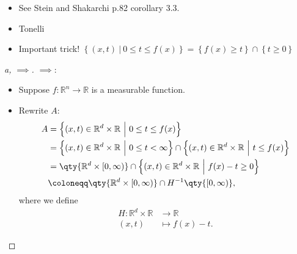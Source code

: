 \begin{concept}

\envlist

\begin{itemize}
\tightlist
\item
  See Stein and Shakarchi p.82 corollary 3.3.
\item
  Tonelli
\item
  Important trick!
  \(\left\{{(x, t) {~\mathrel{\Big|}~}0\leq t \leq f(x)}\right\} = \left\{{ f(x) \geq t}\right\} \cap\left\{{ t\geq 0 }\right\}\)
\end{itemize}

\end{concept}

\begin{solution}

\envlist

\begin{proof}[a, $\implies$]

\(\implies\):

\begin{itemize}
\tightlist
\item
  Suppose \(f:{\mathbb{R}}^n\to {\mathbb{R}}\) is a measurable function.
\item
  Rewrite \(A\):
  \begin{align*}
  A 
  &= \left\{{ (x, t) \in {\mathbb{R}}^d \times{\mathbb{R}}{~\mathrel{\Big|}~}0\leq t \leq f(x) }\right\} \\
  &= \left\{{ (x, t) \in {\mathbb{R}}^d \times{\mathbb{R}}{~\mathrel{\Big|}~}0 \leq t < \infty }\right\} 
  \cap\left\{{ (x, t) \in {\mathbb{R}}^d\times{\mathbb{R}}{~\mathrel{\Big|}~}t\leq f(x) }\right\} \\
  &= \qty{ {\mathbb{R}}^d \times[0, \infty) } 
  \cap\left\{{ (x, t) \in {\mathbb{R}}^d\times{\mathbb{R}}{~\mathrel{\Big|}~}f(x) -t \geq 0  }\right\} \\
  &\coloneqq\qty{ {\mathbb{R}}^d \times[0, \infty) } \cap H^{-1}\qty{[0, \infty)}
  ,\end{align*}
  where we define
  \begin{align*}
  H: {\mathbb{R}}^d \times{\mathbb{R}}&\to {\mathbb{R}}\\
  (x, t) &\mapsto f(x) - t
  .\end{align*}


\end{itemize}
\end{proof}
\end{solution}
